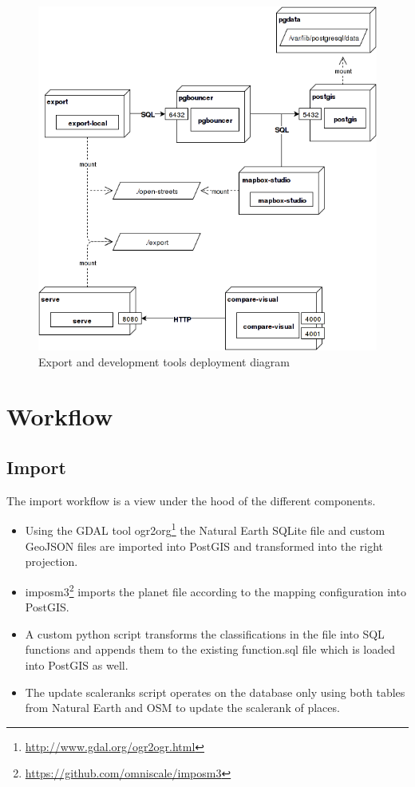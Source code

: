 \begin{figure}[H]
  \includegraphics[scale=0.6]{images/deployment_dev_export.png}
  \caption{Export and development tools deployment diagram}
\end{figure}

\newpage
\section{Workflow}\label{workflow}

\subsection{Import}\label{workflow-import}

The import workflow is a view under the hood of the different components.

\begin{itemize}
\item Using the GDAL tool ogr2org\footnote{\url{http://www.gdal.org/ogr2ogr.html}} the Natural Earth SQLite file and custom GeoJSON files are imported into PostGIS and transformed into the right projection.
\item imposm3\footnote{\url{https://github.com/omniscale/imposm3}} imports the planet file according to the mapping configuration into PostGIS.
\item A custom python script transforms the classifications in the file into SQL functions and appends them to the existing function.sql file which is loaded into PostGIS as well.
\item The update scaleranks script operates on the database only using both tables from Natural Earth and OSM to update the scalerank of places.
\end{itemize}

